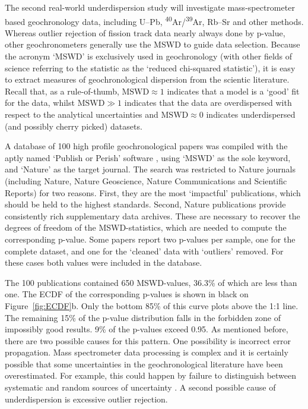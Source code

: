 \documentclass{article}
\begin{document}
The second real-world underdispersion study will investigate
mass-spectrometer based geochronology data, including U--Pb,
\textsuperscript{40}Ar/\textsuperscript{39}Ar, Rb--Sr and other
methods.  Whereas outlier rejection of fission track data nearly
always done by p-value, other geochronometers generally use the MSWD
to guide data selection. Because the acronym `MSWD' is exclusively
used in geochronology (with other fields of science referring to the
statistic as the `reduced chi-squared statistic'), it is easy to
extract measures of geochronological dispersion from the scientic
literature. Recall that, as a rule-of-thumb, $\mbox{MSWD}\approx{1}$
indicates that a model is a `good' fit for the data, whilst
$\mbox{MSWD}\gg{1}$ indicates that the data are overdispersed with
respect to the analytical uncertainties and $\mbox{MSWD}\approx{0}$
indicates underdispersed (and possibly cherry picked)
datasets.\medskip

A database of 100 high profile geochronological papers was compiled
with the aptly named `Publish or Perish' software \citep{harzing2010},
using `MSWD' as the sole keyword, and `Nature' as the target journal.
The search was restricted to Nature journals (including Nature, Nature
Geoscience, Nature Communications and Scientific Reports) for two
reasons. First, they are the most `impactful' publications, which
should be held to the highest standards. Second, Nature publications
provide consistently rich supplementary data archives. These are
necessary to recover the degrees of freedom of the MSWD-statistics,
which are needed to compute the corresponding p-value. Some papers
report two p-values per sample, one for the complete dataset, and one
for the `cleaned' data with `outliers' removed. For these cases both
values were included in the database.
\medskip

The 100 publications contained 650 MSWD-values, 36.3\% of which are
less than one. The ECDF of the corresponding p-values is shown in
black on Figure~\ref{fig:ECDF}b. Only the bottom 85\% of this curve
plots above the 1:1 line. The remaining 15\% of the p-value
distribution falls in the forbidden zone of impossibly good
results. 9\% of the p-values exceed 0.95. As mentioned before, there
are two possible causes for this pattern.  One possibility is
incorrect error propagation. Mass spectrometer data processing is
complex and it is certainly possible that some uncertainties in the
geochronological literature have been overestimated. For example, this
could happen by failure to distinguish between systematic and random
sources of uncertainty \citep{renne1998}.  A second possible cause of
underdispersion is excessive outlier rejection.\medskip
\end{document}
